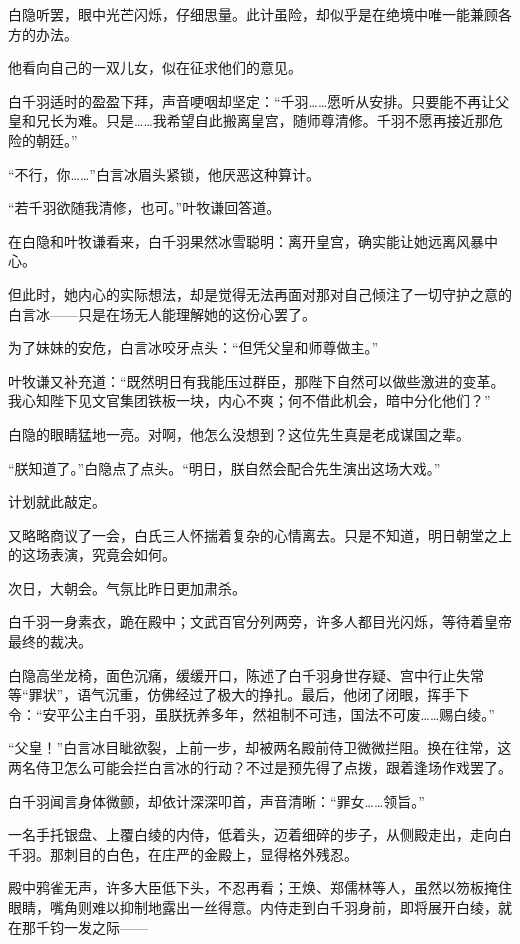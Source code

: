 白隐听罢，眼中光芒闪烁，仔细思量。此计虽险，却似乎是在绝境中唯一能兼顾各方的办法。

他看向自己的一双儿女，似在征求他们的意见。

白千羽适时的盈盈下拜，声音哽咽却坚定：“千羽……愿听从安排。只要能不再让父皇和兄长为难。只是……我希望自此搬离皇宫，随师尊清修。千羽不愿再接近那危险的朝廷。”

“不行，你……”白言冰眉头紧锁，他厌恶这种算计。

“若千羽欲随我清修，也可。”叶牧谦回答道。

在白隐和叶牧谦看来，白千羽果然冰雪聪明：离开皇宫，确实能让她远离风暴中心。

但此时，她内心的实际想法，却是觉得无法再面对那对自己倾注了一切守护之意的白言冰——只是在场无人能理解她的这份心罢了。

为了妹妹的安危，白言冰咬牙点头：“但凭父皇和师尊做主。”

叶牧谦又补充道：“既然明日有我能压过群臣，那陛下自然可以做些激进的变革。我心知陛下见文官集团铁板一块，内心不爽；何不借此机会，暗中分化他们？”

白隐的眼睛猛地一亮。对啊，他怎么没想到？这位先生真是老成谋国之辈。

“朕知道了。”白隐点了点头。“明日，朕自然会配合先生演出这场大戏。”

计划就此敲定。

又略略商议了一会，白氏三人怀揣着复杂的心情离去。只是不知道，明日朝堂之上的这场表演，究竟会如何。

\vspace{2em}

次日，大朝会。气氛比昨日更加肃杀。

白千羽一身素衣，跪在殿中；文武百官分列两旁，许多人都目光闪烁，等待着皇帝最终的裁决。

白隐高坐龙椅，面色沉痛，缓缓开口，陈述了白千羽身世存疑、宫中行止失常等“罪状”，语气沉重，仿佛经过了极大的挣扎。最后，他闭了闭眼，挥手下令：“安平公主白千羽，虽朕抚养多年，然祖制不可违，国法不可废……赐白绫。”

“父皇！”白言冰目眦欲裂，上前一步，却被两名殿前侍卫微微拦阻。换在往常，这两名侍卫怎么可能会拦白言冰的行动？不过是预先得了点拨，跟着逢场作戏罢了。

白千羽闻言身体微颤，却依计深深叩首，声音清晰：“罪女……领旨。”

一名手托银盘、上覆白绫的内侍，低着头，迈着细碎的步子，从侧殿走出，走向白千羽。那刺目的白色，在庄严的金殿上，显得格外残忍。

殿中鸦雀无声，许多大臣低下头，不忍再看；王焕、郑儒林等人，虽然以笏板掩住眼睛，嘴角则难以抑制地露出一丝得意。内侍走到白千羽身前，即将展开白绫，就在那千钧一发之际——


